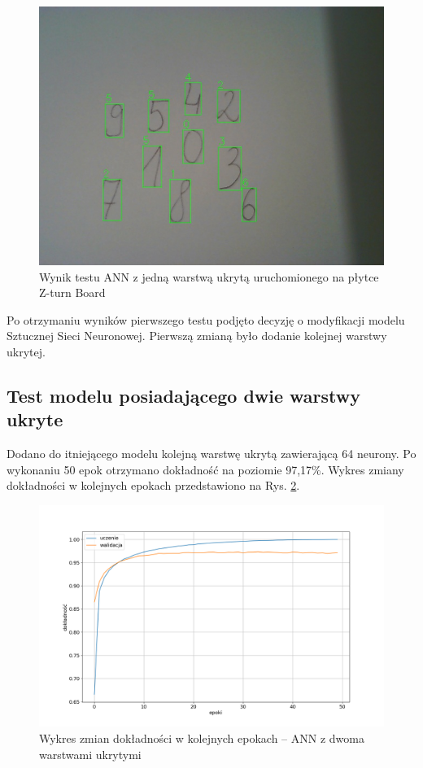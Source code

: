 \begin{figure}[!h]
    \centering
    \includegraphics[width=\textwidth]{img/1hid-layer-zturn-img.jpg}
    \caption{Wynik testu ANN z jedną warstwą ukrytą uruchomionego na płytce Z-turn Board}
    \label{1hid-layer-zturn-img}
\end{figure}

Po otrzymaniu wyników pierwszego testu podjęto decyzję o modyfikacji modelu Sztucznej Sieci Neuronowej. Pierwszą zmianą było dodanie kolejnej warstwy ukrytej.

\subsection{Test modelu posiadającego dwie warstwy ukryte}

Dodano do itniejącego modelu kolejną warstwę ukrytą zawierającą 64 neurony. Po wykonaniu 50 epok otrzymano dokładność na poziomie 97,17\%. Wykres zmiany dokładności w kolejnych epokach przedstawiono na Rys. \ref{keras-accuracy2}.

\begin{figure}
    \centering
    \includegraphics[width=\textwidth]{img/keras-accuracy2.png}
    \caption{Wykres zmian dokładności w kolejnych epokach -- ANN z dwoma warstwami ukrytymi}
    \label{keras-accuracy2}
  \end{figure}


